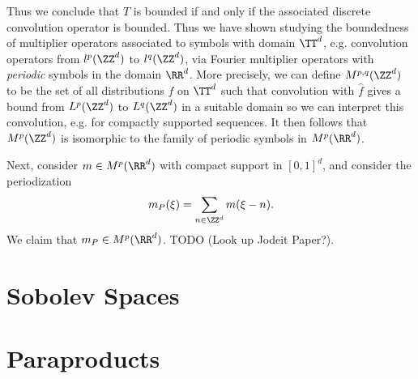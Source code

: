 \begin{example}
    Thus we conclude that $T$ is bounded if and only if the associated discrete convolution operator is bounded. Thus we have shown studying the boundedness of multiplier operators associated to symbols with domain $\TT^d$, e.g. convolution operators from $l^p(\ZZ^d)$ to $l^q(\ZZ^d)$, via Fourier multiplier operators with \emph{periodic} symbols in the domain $\RR^d$. More precisely, we can define $M^{p,q}(\ZZ^d)$ to be the set of all distributions $f$ on $\TT^d$ such that convolution with $\widehat{f}$ gives a bound from $L^p(\ZZ^d)$ to $L^q(\ZZ^d)$ in a suitable domain so we can interpret this convolution, e.g. for compactly supported sequences. It then follows that $M^p(\ZZ^d)$ is isomorphic to the family of periodic symbols in $M^p(\RR^d)$.
\end{example}

\begin{example}
    Next, consider $m \in M^p(\RR^d)$ with compact support in $[0,1]^d$, and consider the periodization
    \[ m_P(\xi) = \sum_{n \in \ZZ^d} m(\xi - n). \]
    We claim that $m_P \in M^p(\RR^d)$. TODO (Look up Jodeit Paper?).
\end{example}













\chapter{Sobolev Spaces}













\chapter{Paraproducts}

